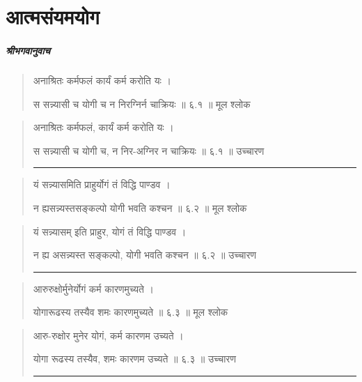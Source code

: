 \chapter{\sanskrit आत्मसंयमयोग}



\paragraph{\sanskrit श्रीभगवानुवाच}
\begin{quotation}
अनाश्रितः कर्मफलं कार्यं कर्म करोति यः  ।  

स सन्न्यासी च योगी च न निरग्निर्न चाक्रियः  ॥ ६.१ ॥  मूल श्लोक
\end{quotation}

\begin{quotation}

अनाश्रितः कर्मफलं, कार्यं कर्म करोति यः  ।  

स सन्न्यासी च योगी च, न निर-अग्निर न चाक्रियः  ॥ ६.१ ॥  उच्चारण

\noindent\rule{16cm}{0.4pt} 
\end{quotation}


\begin{quotation}  

यं सन्न्यासमिति प्राहुर्योगं तं विद्धि पाण्डव  ।  

न ह्यसन्न्यस्तसङ्‍कल्पो योगी भवति कश्चन  ॥ ६.२ ॥  मूल श्लोक
\end{quotation}

\begin{quotation}

यं सन्न्यासम् इति प्राहुर, योगं तं विद्धि पाण्डव  ।  

न ह्य असन्न्यस्त सङ्‍कल्पो, योगी भवति कश्चन  ॥ ६.२ ॥  उच्चारण

\noindent\rule{16cm}{0.4pt} 
\end{quotation}


\begin{quotation}  

आरुरुक्षोर्मुनेर्योगं कर्म कारणमुच्यते  ।  

योगारूढस्य तस्यैव शमः कारणमुच्यते  ॥ ६.३ ॥  मूल श्लोक
\end{quotation}

\begin{quotation}

आरु-रुक्षोर मुनेर योगं, कर्म कारणम उच्यते  ।  

योगा रूढस्य तस्यैव, शमः कारणम उच्यते  ॥ ६.३ ॥  उच्चारण

\noindent\rule{16cm}{0.4pt} 
\end{quotation}


